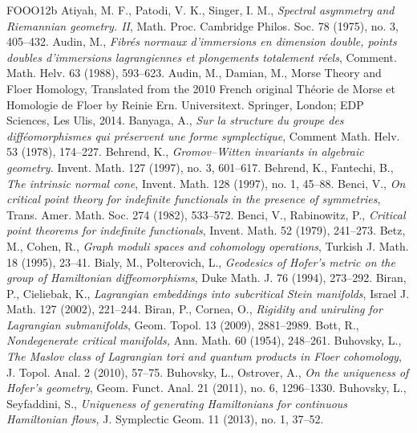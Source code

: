 \begin{thebibliography}{FOOO12b}
 Atiyah, M. F., Patodi, V. K., Singer, I. M., \textit{Spectral asymmetry and Riemannian geometry. II}, Math. Proc. Cambridge Philos. Soc. 78 (1975), no. 3, 405--432.
 Audin, M., \textit{Fibrés normaux d\textquoteright{}immersions en dimension double, points doubles d\textquoteright{}immersions lagrangiennes et plongements totalement réels}, Comment. Math. Helv. 63 (1988), 593--623.
 Audin, M., Damian, M., Morse Theory and Floer Homology, Translated from the 2010 French original Théorie de Morse et Homologie de Floer by Reinie Ern. Universitext. Springer, London; EDP Sciences, Les Ulis, 2014.
 Banyaga, A., \textit{Sur la structure du groupe des difféomorphismes qui préservent une forme symplectique}, Comment Math. Helv. 53 (1978), 174--227.
 Behrend, K., \textit{Gromov--Witten invariants in algebraic geometry.} Invent. Math. 127 (1997), no. 3, 601--617.
 Behrend, K., Fantechi, B., \textit{The intrinsic normal cone}, Invent. Math. 128 (1997), no. 1, 45--88.
 Benci, V., \textit{On critical point theory for indefinite functionals in the presence of symmetries}, Trans. Amer. Math. Soc. 274 (1982), 533--572.
 Benci, V., Rabinowitz, P., \textit{Critical point theorems for indefinite functionals}, Invent. Math. 52 (1979), 241--273.
 Betz, M., Cohen, R., \textit{Graph moduli spaces and cohomology operations}, Turkish J. Math. 18 (1995), 23--41.
 Bialy, M., Polterovich, L., \textit{Geodesics of Hofer\textquoteright{}s metric on the group of Hamiltonian diffeomorphisms}, Duke Math. J. 76 (1994), 273--292.
 Biran, P., Cieliebak, K., \textit{Lagrangian embeddings into subcritical Stein manifolds}, Israel J. Math. 127 (2002), 221--244.
 Biran, P., Cornea, O., \textit{Rigidity and uniruling for Lagrangian submanifolds}, Geom. Topol. 13 (2009), 2881--2989.
 Bott, R., \textit{Nondegenerate critical manifolds,} Ann. Math. 60 (1954), 248--261.
 Buhovsky, L., \textit{The Maslov class of Lagrangian tori and quantum products in Floer cohomology}, J. Topol. Anal. 2 (2010), 57--75.
 Buhovsky, L., Ostrover, A., \textit{On the uniqueness of Hofer\textquoteright{}s geometry}, Geom. Funct. Anal. 21 (2011), no. 6, 1296--1330.
 Buhovsky, L., Seyfaddini, S., \textit{Uniqueness of generating Hamiltonians for continuous Hamiltonian flows,} J. Symplectic Geom. 11 (2013), no. 1, 37--52.

\end{thebibliography}
